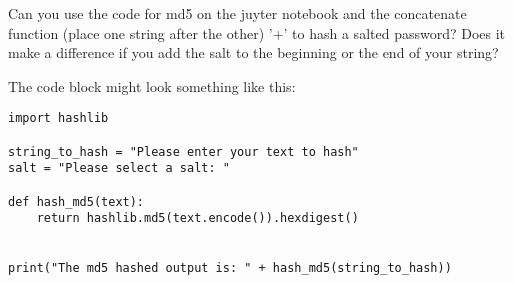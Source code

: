 \documentclass[11pt,a4paper]{report}
\begin{document}
\begin{ex}
Can you use the code for md5 on the juyter notebook and the concatenate function (place one string after the other)  '+' to hash a salted password? Does it make a difference if you add the salt to the beginning or the end of your string?

The code block might look something like this:

\begin{lstlisting}
import hashlib

string_to_hash = "Please enter your text to hash"
salt = "Please select a salt: "

def hash_md5(text):
    return hashlib.md5(text.encode()).hexdigest()


print("The md5 hashed output is: " + hash_md5(string_to_hash))

\end{lstlisting}


\end{ex}
\end{document}
